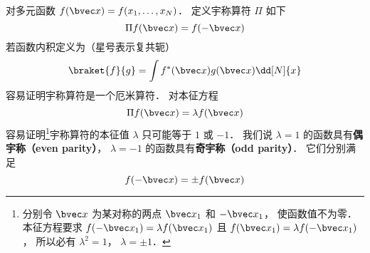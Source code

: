 

对多元函数 $f(\bvec x) = f(x_1, \dots, x_N)$．  定义宇称算符 $\Pi$ 如下
\begin{equation}
\Pi f(\bvec x) = f(-\bvec x)
\end{equation}
若函数内积定义为（星号表示复共轭）
\begin{equation}
\braket{f}{g} = \int f^*(\bvec x) g(\bvec x) \dd[N]{x}
\end{equation}
容易证明宇称算符是一个厄米算符．%
对本征方程
\begin{equation}
\Pi f(\bvec x) = \lambda f(\bvec x)
\end{equation}
容易证明\footnote{分别令 $\bvec x$ 为某对称的两点 $\bvec x_1$ 和 $-\bvec x_1$， 使函数值不为零． 本征方程要求 $f(-\bvec x_1) = \lambda f(\bvec x_1)$ 且 $f(\bvec x_1) = \lambda f(-\bvec x_1)$， 所以必有 $\lambda^2 = 1$， $\lambda = \pm 1$．}宇称算符的本征值 $\lambda$ 只可能等于 $1$ 或 $-1$． 我们说 $\lambda = 1$ 的函数具有\textbf{偶宇称（even parity）}， $\lambda = -1$ 的函数具有\textbf{奇宇称（odd parity）}． 它们分别满足
\begin{equation}
f(-\bvec x) = \pm f(\bvec x)
\end{equation}

